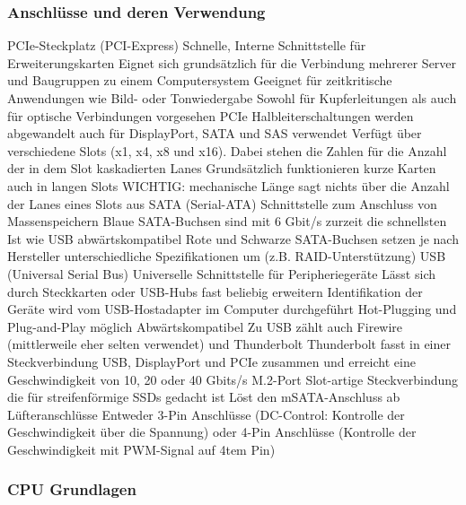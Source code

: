 \documentclass[asp1.tex]{subfiles}
\begin{document}
\subsubsection{Anschlüsse und deren Verwendung}

\begin{outline}
    \1 PCIe-Steckplatz (PCI-Express)
    \2 Schnelle, Interne Schnittstelle für Erweiterungskarten
    \2 Eignet sich grundsätzlich für die Verbindung mehrerer Server und Baugruppen zu einem Computersystem
    \2 Geeignet für zeitkritische Anwendungen wie Bild- oder Tonwiedergabe
    \2 Sowohl für Kupferleitungen als auch für optische Verbindungen vorgesehen
    \2 PCIe Halbleiterschaltungen werden abgewandelt auch für DisplayPort, SATA und SAS verwendet
    \2 Verfügt über verschiedene Slots (x1, x4, x8 und x16). Dabei stehen die Zahlen für die Anzahl der in dem Slot kaskadierten Lanes
    \2 Grundsätzlich funktionieren kurze Karten auch in langen Slots
    \2 WICHTIG: mechanische Länge sagt nichts über die Anzahl der Lanes eines Slots aus
    \1 SATA (Serial-ATA)
    \2 Schnittstelle zum Anschluss von Massenspeichern
    \2 Blaue SATA-Buchsen sind mit 6 Gbit/s zurzeit die schnellsten
    \2 Ist wie USB abwärtskompatibel
    \2 Rote und Schwarze SATA-Buchsen setzen je nach Hersteller unterschiedliche Spezifikationen um (z.B. RAID-Unterstützung)
    \1 USB (Universal Serial Bus)
    \2 Universelle Schnittstelle für Peripheriegeräte
    \2 Lässt sich durch Steckkarten oder USB-Hubs fast beliebig erweitern
    \2 Identifikation der Geräte wird vom USB-Hostadapter im Computer durchgeführt
    \2 Hot-Plugging und Plug-and-Play möglich
    \2 Abwärtskompatibel
    \2 Zu USB zählt auch Firewire (mittlerweile eher selten verwendet) und Thunderbolt
    \2 Thunderbolt fasst in einer Steckverbindung USB, DisplayPort und PCIe zusammen und erreicht eine Geschwindigkeit von 10, 20 oder 40 Gbits/s
    \1 M.2-Port
    \2 Slot-artige Steckverbindung die für streifenförmige SSDs gedacht ist
    \2 Löst den mSATA-Anschluss ab
    \1 Lüfteranschlüsse
    \2 Entweder 3-Pin Anschlüsse (DC-Control: Kontrolle der Geschwindigkeit über die Spannung) oder 4-Pin Anschlüsse (Kontrolle der Geschwindigkeit mit PWM-Signal auf 4tem Pin)

\end{outline}

\subsubsection{CPU Grundlagen}
\end{document}
